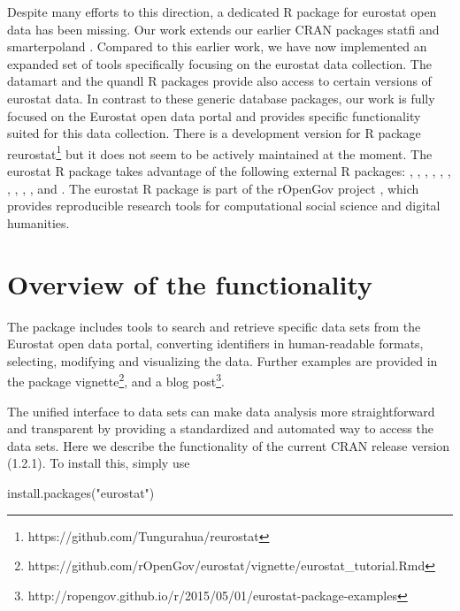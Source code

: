 Despite many efforts to this direction, a dedicated R package for
eurostat open data has been missing. Our work extends our earlier CRAN
packages statfi \citep{statfi} and smarterpoland
\citep{smarterpoland}. Compared to this earlier work, we have now
implemented an expanded set of tools specifically focusing on the
eurostat data collection. The datamart \citep{datamart} and the quandl
\citep{quandl} R packages provide also access to certain versions of
eurostat data. In contrast to these generic database packages, our
work is fully focused on the Eurostat open data portal and provides
specific functionality suited for this data collection. There is a
development version for R package
reurostat\footnote{https://github.com/Tungurahua/reurostat} but it
does not seem to be actively maintained at the moment. The eurostat R
package takes advantage of the following external R packages:
 \citep{devtools},  \citep{dplyr},
 \citep{knitr},  \citep{ggplot2},
 \citep{mapproj},  \citep{plotrix},
 \citep{reshape2}, 
\citep{rmarkdown},  \citep{stringi},
 \citep{testthat}, and 
\citep{tidyr}. The eurostat R package is part of the rOpenGov project
\citep{Lahti13icml}, which provides reproducible research tools for
computational social science and digital humanities.


\section{Overview of the functionality}

The package includes tools to search and retrieve specific data sets
from the Eurostat open data portal, converting identifiers in
human-readable formats, selecting, modifying and visualizing the
data. Further examples are provided in the package
vignette\footnote{https://github.com/rOpenGov/eurostat/vignette/eurostat\_tutorial.Rmd},
and a blog
post\footnote{http://ropengov.github.io/r/2015/05/01/eurostat-package-examples}.

The unified interface to data sets can make data analysis more
straightforward and transparent by providing a standardized and
automated way to access the data sets. Here we describe the
functionality of the current CRAN release version (1.2.1). To install
this, simply use


\begin{example}
install.packages("eurostat")
\end{example}

